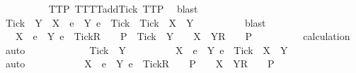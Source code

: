 \begin{isabellebody}
\ \ \ \ \ \ \ \ \isamarkupfalse%
\ TT{}{\isacharunderscore}P\ TT{}{\isacharunderscore}TT{}{\isacharunderscore}add{\isacharunderscore}Tick\ TT{}{\isacharunderscore}P\ \isamarkupfalse%
\ blast\isanewline
\ \ \ \ \ \ \isamarkupfalse%
\ \isamarkupfalse%
\ {\isachardoublequoteopen}Tick\ {\isasymin}\ Y\ {\isasymLongrightarrow}\ X\ {\isasymunion}\ {\isacharbraceleft}e\ {\isasymin}\ Y{\isachardot}\ e\ {\isasymnoteq}\ Tick{\isacharbraceright}\ {\isasymunion}\ {\isacharbraceleft}Tick{\isacharbraceright}\ {\isacharequal}\ X\ {\isasymunion}\ Y{\isachardoublequoteclose}\isanewline
\ \ \ \ \ \ \ \ \isamarkupfalse%
\ blast\isanewline
\ \ \ \ \ \ \isamarkupfalse%
\ \isamarkupfalse%
\ {\isachardoublequoteopen}{\isasymrho}\ {\isacharat}\ {\isacharbrackleft}X\ {\isasymunion}\ {\isacharbraceleft}e\ {\isasymin}\ Y{\isachardot}\ e\ {\isasymnoteq}\ Tick{\isacharbraceright}{\isacharbrackright}\isactrlsub R\ {\isacharhash}\ {\isasymsigma}\ {\isasymin}\ P\ {\isasymLongrightarrow}\ Tick\ {\isasymin}\ Y\ {\isasymLongrightarrow}\ {\isasymrho}\ {\isacharat}\ {\isacharbrackleft}X\ {\isasymunion}\ Y{\isacharbrackright}\isactrlsub R\ {\isacharhash}\ {\isasymsigma}\ {\isasymin}\ P{\isachardoublequoteclose}\isanewline
\ \ \ \ \ \ \ \ \isamarkupfalse%
\ calculation\ \isamarkupfalse%
\ auto\isanewline
\ \ \ \ \isamarkupfalse%
\isanewline
\ \ \ \ \ \ \isamarkupfalse%
\ {\isachardoublequoteopen}Tick\ {\isasymnotin}\ Y{\isachardoublequoteclose}\isanewline
\ \ \ \ \ \ \isamarkupfalse%
\ \isamarkupfalse%
\ {\isachardoublequoteopen}X\ {\isasymunion}\ {\isacharbraceleft}e\ {\isasymin}\ Y{\isachardot}\ e\ {\isasymnoteq}\ Tick{\isacharbraceright}\ {\isacharequal}\ X\ {\isasymunion}\ Y{\isachardoublequoteclose}\isanewline
\ \ \ \ \ \ \ \ \isamarkupfalse%
\ auto\isanewline
\ \ \ \ \ \ \isamarkupfalse%
\ \isamarkupfalse%
\ {\isachardoublequoteopen}{\isasymrho}\ {\isacharat}\ {\isacharbrackleft}X\ {\isasymunion}\ {\isacharbraceleft}e\ {\isasymin}\ Y{\isachardot}\ e\ {\isasymnoteq}\ Tick{\isacharbraceright}{\isacharbrackright}\isactrlsub R\ {\isacharhash}\ {\isasymsigma}\ {\isasymin}\ P\ {\isasymLongrightarrow}\ {\isasymrho}\ {\isacharat}\ {\isacharbrackleft}X\ {\isasymunion}\ Y{\isacharbrackright}\isactrlsub R\ {\isacharhash}\ {\isasymsigma}\ {\isasymin}\ P{\isachardoublequoteclose}\isanewline

\end{isabellebody}
